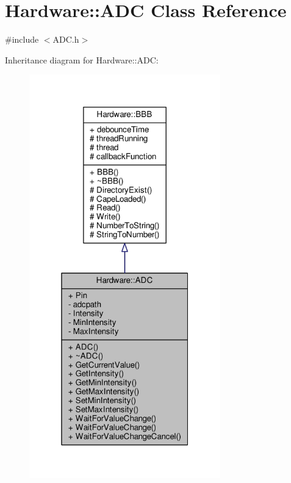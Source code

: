 \hypertarget{class_hardware_1_1_a_d_c}{}\section{Hardware\+:\+:A\+D\+C Class Reference}
\label{class_hardware_1_1_a_d_c}


{\ttfamily \#include $<$A\+D\+C.\+h$>$}



Inheritance diagram for Hardware\+:\+:A\+D\+C\+:\nopagebreak
\begin{figure}[H]
\begin{center}
\leavevmode
\includegraphics[width=235pt]{class_hardware_1_1_a_d_c__inherit__graph}
\end{center}
\end{figure}


